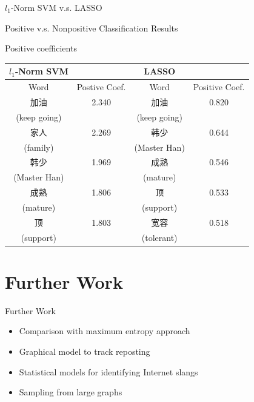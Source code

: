 \documentclass[12pt, trans]{beamer}
\newcommand{\1}[1]{{\mathbf 1}\left\{#1\right\}}        %
\begin{document}
\begin{frame}{$l_1$-Norm SVM v.s. LASSO}

\begin{center}
Positive v.s. Nonpositive Classification Results

Positive coefficients
\end{center}

\footnotesize
\begin{center}
\begin{tabular}{|c|c||c|c|}
\hline
$l_1$-Norm SVM & & LASSO &  \\ \hline
Word & Postive Coef. & Word & Positive Coef.\\ \hline\hline
加油 & 2.340 & 加油 & 0.820\\
(keep going) & & (keep going) &\\\hline
家人 & 2.269 & 韩少 & 0.644\\
(family) & & (Master Han) &  \\\hline
韩少 & 1.969 & 成熟 & 0.546\\
(Master Han) & & (mature) &  \\\hline
成熟 & 1.806 & 顶 & 0.533\\
(mature) & & (support) &  \\\hline
顶 & 1.803 & 宽容 & 0.518\\
(support) & & (tolerant) &  \\\hline
\end{tabular}
\end{center}





\end{frame}

\section{Further Work}

\begin{frame}{Further Work}

\begin{itemize}[<+->]
\item Comparison with maximum entropy approach
\item Graphical model to track reposting
\item Statistical models for identifying Internet slangs
\item Sampling from large graphs
\end{itemize}

\end{frame}
\end{document}
